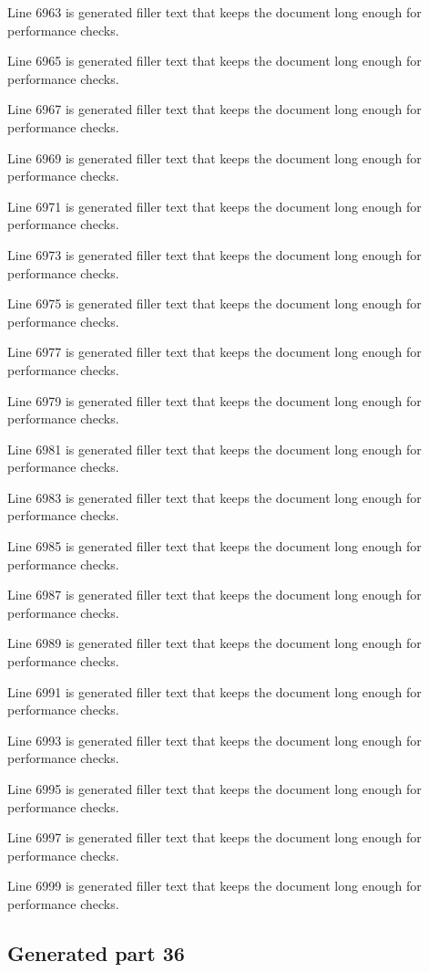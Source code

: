 Line 6963 is generated filler text that keeps the document long enough for performance checks.

Line 6965 is generated filler text that keeps the document long enough for performance checks.

Line 6967 is generated filler text that keeps the document long enough for performance checks.

Line 6969 is generated filler text that keeps the document long enough for performance checks.

Line 6971 is generated filler text that keeps the document long enough for performance checks.

Line 6973 is generated filler text that keeps the document long enough for performance checks.

Line 6975 is generated filler text that keeps the document long enough for performance checks.

Line 6977 is generated filler text that keeps the document long enough for performance checks.

Line 6979 is generated filler text that keeps the document long enough for performance checks.

Line 6981 is generated filler text that keeps the document long enough for performance checks.

Line 6983 is generated filler text that keeps the document long enough for performance checks.

Line 6985 is generated filler text that keeps the document long enough for performance checks.

Line 6987 is generated filler text that keeps the document long enough for performance checks.

Line 6989 is generated filler text that keeps the document long enough for performance checks.

Line 6991 is generated filler text that keeps the document long enough for performance checks.

Line 6993 is generated filler text that keeps the document long enough for performance checks.

Line 6995 is generated filler text that keeps the document long enough for performance checks.

Line 6997 is generated filler text that keeps the document long enough for performance checks.

Line 6999 is generated filler text that keeps the document long enough for performance checks.

\subsection{Generated part 36}

